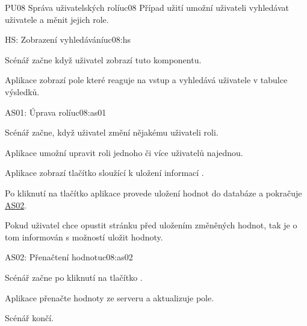 \begin{usecase}{PU08 Správa uživatelských rolí}{uc08}
    Případ užití umožní uživateli vyhledávat uživatele a měnit jejich role.

    \begin{scenario}{HS: Zobrazení vyhledávání}{uc08:hs}
        \item Scénář začne když uživatel zobrazí tuto komponentu.
        \item Aplikace zobrazí pole které reaguje na vstup a vyhledává uživatele v tabulce výsledků.
    \end{scenario}

    \begin{scenario}{AS01: Úprava rolí}{uc08:as01}
        \item Scénář začne, když uživatel změní nějakému uživateli roli.
        \item Aplikace umožní upravit roli jednoho či více uživatelů najednou.
        \item Aplikace zobrazí tlačítko sloužící k uložení informací .
        \item Po kliknutí na tlačítko  aplikace provede uložení hodnot do databáze a pokračuje \hyperref[uc02:as02]{AS02}.
        \item Pokud uživatel chce opustit stránku před uložením změněných hodnot, tak je o tom informován s možností uložit hodnoty.
    \end{scenario}

    \begin{scenario}{AS02: Přenačtení hodnot}{uc08:as02}
        \item Scénář začne po kliknutí na tlačítko .
        \item Aplikace přenačte hodnoty ze serveru a aktualizuje pole.
        \item Scénář končí.
    \end{scenario}
\end{usecase}